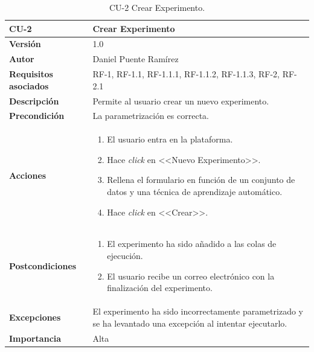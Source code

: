 \begin{table}[p]
\centering
\begin{tabularx}{\linewidth}{ p{} p{} }
\toprule
\textbf{CU-2} & \textbf{Crear Experimento}\\
\toprule
\textbf{Versión} & 1.0\\
\textbf{Autor} & Daniel Puente Ramírez\\
\textbf{Requisitos asociados} & RF-1, RF-1.1, RF-1.1.1, RF-1.1.2, RF-1.1.3, RF-2, RF-2.1\\
\textbf{Descripción} & Permite al usuario crear un nuevo experimento.\\
\textbf{Precondición} & La parametrización es correcta.\\
\textbf{Acciones} &
\begin{enumerate}
\def\labelenumi{\arabic{enumi}.}
\tightlist
\item El usuario entra en la plataforma.
\item Hace \textit{click} en <<Nuevo Experimento>>.
\item Rellena el formulario en función de un conjunto de datos y una técnica de aprendizaje automático.
\item Hace \textit{click} en <<Crear>>.
\end{enumerate}\\
\textbf{Postcondiciones} & 
\begin{enumerate}
\tightlist
\item El experimento ha sido añadido a las colas de ejecución.
\item El usuario recibe un correo electrónico con la finalización del experimento.
\end{enumerate}\\
\textbf{Excepciones} & El experimento ha sido incorrectamente parametrizado y se ha levantado una excepción al intentar ejecutarlo.\\
\textbf{Importancia} & Alta \\
\bottomrule
\end{tabularx}
\caption{CU-2 Crear Experimento.}
\end{table}

